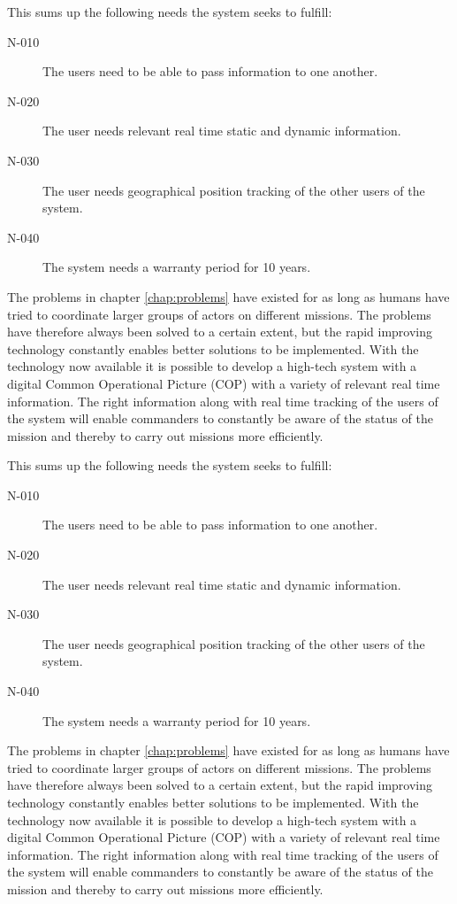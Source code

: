 This sums up the following needs the system seeks to fulfill:

\begin{description}
\item[N-010] The users need to be able to pass information to one another. 
\item[N-020] The user needs relevant real time static and dynamic information. 
\item[N-030] The user needs geographical position tracking of the other users of the system.
\item[N-040] The system needs a warranty period for 10 years. 
\end{description}
	
	
The problems in chapter \ref{chap:problems} have existed for as long as humans have tried to coordinate larger groups of actors on different missions. The problems have therefore always been solved to a certain extent, but the rapid improving technology constantly enables better solutions to be implemented. With the technology now available it is possible to develop a high-tech system with a digital Common Operational Picture (COP) with a variety of relevant real time information. The right information along with real time tracking of the users of the system will enable commanders to constantly be aware of the status of the mission and thereby to carry out missions more efficiently. 

This sums up the following needs the system seeks to fulfill:

\begin{description}
\item[N-010] The users need to be able to pass information to one another. 
\item[N-020] The user needs relevant real time static and dynamic information. 
\item[N-030] The user needs geographical position tracking of the other users of the system.
\item[N-040] The system needs a warranty period for 10 years. 
\end{description}
	
The problems in chapter \ref{chap:problems} have existed for as long as humans have tried to coordinate larger groups of actors on different missions. The problems have therefore always been solved to a certain extent, but the rapid improving technology constantly enables better solutions to be implemented. With the technology now available it is possible to develop a high-tech system with a digital Common Operational Picture (COP) with a variety of relevant real time information. The right information along with real time tracking of the users of the system will enable commanders to constantly be aware of the status of the mission and thereby to carry out missions more efficiently. 

